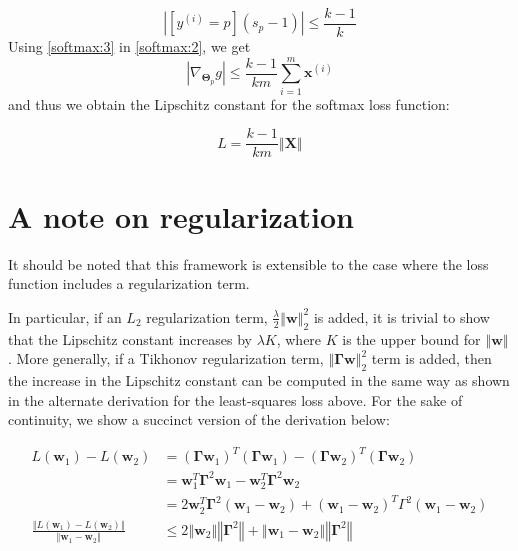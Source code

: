 \documentclass{article}
\begin{document}
\begin{equation}
    |[y^{(i)} = p](s_p-1)| \leq \frac{k-1}{k} \label{softmax:3}
\end{equation}
Using \eqref{softmax:3} in \eqref{softmax:2}, we get
\[
    |\nabla_{\boldsymbol\Theta_p} g| \leq \frac{k-1}{km} \sum\limits_{i=1}^m \textbf{x}^{(i)}
\]
and thus we obtain the Lipschitz constant for the softmax loss function:

\[
    \boxed{
        L = \frac{k-1}{km}\left\Vert \textbf{X} \right\Vert
    }
\]

\section{A note on regularization} \label{regularization}
It should be noted that this framework is extensible to the case where the loss function includes a regularization term. 

In particular, if an $L_2$ regularization term, $\frac{\lambda}{2}\left\Vert \textbf{w} \right\Vert_2^2$ is added, it is trivial to show that the Lipschitz constant increases by $\lambda K$, where $K$ is the upper bound for $\left\Vert \textbf{w} \right\Vert$. More generally, if a Tikhonov regularization term, $\left\Vert \boldsymbol\Gamma \textbf{w} \right\Vert_2^2$ term is added, then the increase in the Lipschitz constant can be computed in the same way as shown in the alternate derivation for the least-squares loss above. For the sake of continuity, we show a succinct version of the derivation below:

\[
    \begin{aligned}
        L(\textbf{w}_1) - L(\textbf{w}_2) &= (\boldsymbol\Gamma \textbf{w}_1)^T (\boldsymbol\Gamma \textbf{w}_1) - (\boldsymbol\Gamma \textbf{w}_2)^T (\boldsymbol\Gamma \textbf{w}_2) \\
        &= \textbf{w}_1^T \boldsymbol\Gamma^2 \textbf{w}_1 - \textbf{w}_2^T \boldsymbol\Gamma^2 \textbf{w}_2 \\
        &= 2\textbf{w}_2^T \boldsymbol\Gamma^2 (\textbf{w}_1 - \textbf{w}_2) + (\textbf{w}_1-\textbf{w}_2)^T \Gamma^2 (\textbf{w}_1-\textbf{w}_2) \\
        \frac{\left\Vert L(\textbf{w}_1) - L(\textbf{w}_2) \right\Vert}{\left\Vert \textbf{w}_1-\textbf{w}_2 \right\Vert} & \leq 2 \left\Vert \textbf{w}_2 \right\Vert \left\Vert \boldsymbol\Gamma^2 \right\Vert + \left\Vert \textbf{w}_1-\textbf{w}_2 \right\Vert \left\Vert \boldsymbol\Gamma^2 \right\Vert 
    \end{aligned}
\]
\end{document}

